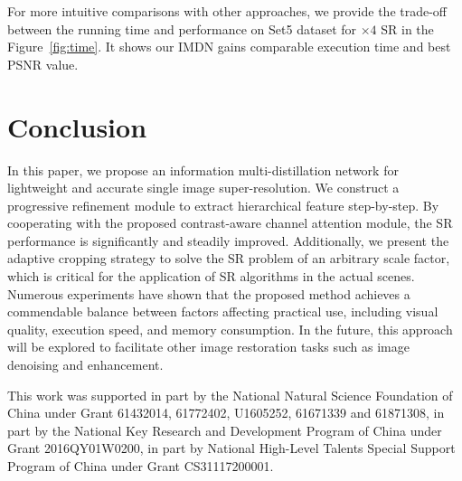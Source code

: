 \documentclass[sigconf]{acmart}
\begin{document}
For more intuitive comparisons with other approaches, we provide the trade-off between the running time and performance on Set5 dataset for $\times 4$ SR in the Figure~\ref{fig:time}. It shows our IMDN gains comparable execution time and best PSNR value.

\section{Conclusion}\label{sec:conclusion}
In this paper, we propose an information multi-distillation network for lightweight and accurate single image super-resolution. We construct a progressive refinement module to extract hierarchical feature step-by-step. By cooperating with the proposed contrast-aware channel attention module, the SR performance is significantly and steadily improved. Additionally, we present the adaptive cropping strategy to solve the SR problem of an arbitrary scale factor, which is critical for the application of SR algorithms in the actual scenes. Numerous experiments have shown that the proposed method achieves a commendable balance between factors affecting practical use, including visual quality, execution speed, and memory consumption. In the future, this approach will be explored to facilitate other image restoration tasks such as image denoising and enhancement.

\begin{acks}
	This work was supported in part by the National Natural Science Foundation of China under Grant 61432014, 61772402, U1605252, 61671339 and 61871308, in part by the National Key Research and Development Program of China under Grant 2016QY01W0200, in part by National High-Level Talents Special Support Program of China under Grant CS31117200001.
\end{acks}

\clearpage

\balance

\end{document}
